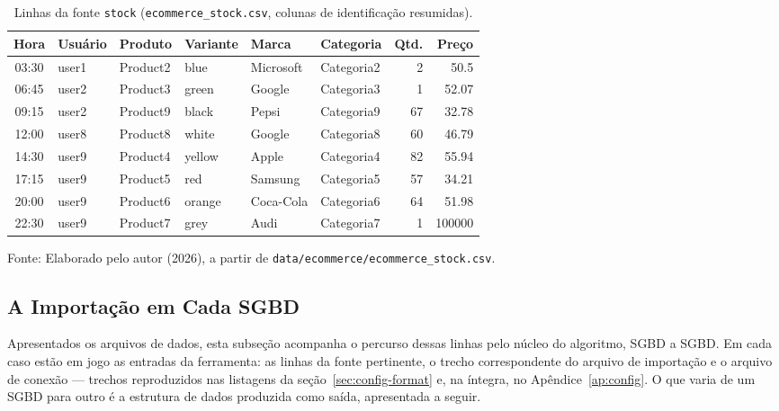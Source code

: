 \begin{table}[H]
  \caption{Linhas da fonte \texttt{stock} (\texttt{ecommerce\_stock.csv}, colunas de identificação resumidas).}
  \label{tab:csv-stock}
  \centering
  \begin{tabular}{c l l l l l r r}
    \toprule
    \textbf{Hora} & \textbf{Usuário} & \textbf{Produto} & \textbf{Variante} & \textbf{Marca} & \textbf{Categoria} & \textbf{Qtd.} & \textbf{Preço} \\
    \midrule
    03:30 & user1 & Product2 & blue   & Microsoft & Categoria2 &  2 & 50.5 \\
    06:45 & user2 & Product3 & green  & Google    & Categoria3 &  1 & 52.07 \\
    09:15 & user2 & Product9 & black  & Pepsi     & Categoria9 & 67 & 32.78 \\
    12:00 & user8 & Product8 & white  & Google    & Categoria8 & 60 & 46.79 \\
    14:30 & user9 & Product4 & yellow & Apple     & Categoria4 & 82 & 55.94 \\
    17:15 & user9 & Product5 & red    & Samsung   & Categoria5 & 57 & 34.21 \\
    20:00 & user9 & Product6 & orange & Coca-Cola & Categoria6 & 64 & 51.98 \\
    22:30 & user9 & Product7 & grey   & Audi      & Categoria7 &  1 & 100000 \\
    \bottomrule
  \end{tabular}
  \par\vspace{4pt}
  {\footnotesize Fonte: Elaborado pelo autor (2026), a partir de \texttt{data/ecommerce/ecommerce\_stock.csv}.}
\end{table}

\subsection{A Importação em Cada SGBD}
\label{sec:importacao-sgbds}

Apresentados os arquivos de dados, esta subseção acompanha o percurso dessas linhas pelo
núcleo do algoritmo, SGBD a SGBD. Em cada caso estão em jogo as entradas da ferramenta:
as linhas da fonte pertinente, o trecho correspondente do arquivo de importação e o
arquivo de conexão --- trechos reproduzidos nas listagens da
seção~\ref{sec:config-format} e, na íntegra, no Apêndice~\ref{ap:config}. O que varia
de um SGBD para outro é a estrutura de dados produzida como saída, apresentada a
seguir.

